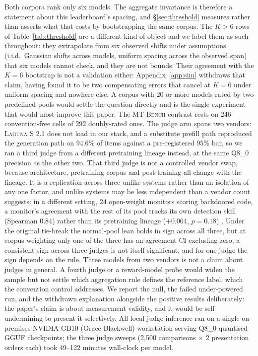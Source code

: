 \documentclass{article}
\begin{document}
Both corpora rank only six models. The aggregate invariance is therefore a statement
about this leaderboard's spacing, and \S\ref{sec:threshold} measures rather than asserts
what that costs by bootstrapping the same corpus. The $K > 6$ rows of
Table~\ref{tab:threshold} are a different kind of object and we label them as such
throughout: they extrapolate from six observed shifts under assumptions (i.i.d.\
Gaussian shifts across models, uniform spacing across the observed span) that six models
cannot check, and they are not bounds. Their agreement with the $K=6$ bootstrap is not a
validation either: Appendix~\ref{app:sim} withdraws that claim, having found it to be two
compensating errors that cancel at $K=6$ under uniform spacing and nowhere else. A corpus with $20$ or more models rated by two predefined
pools would settle the question directly and is the single experiment that would most
improve this paper. The \textsc{MT-Bench} contrast rests on $246$ convention-free cells of $292$
doubly-rated ones. The judge arm spans two vendors: \textsc{Laguna S 2.1} does not load in our stack, and a
substitute prefill path reproduced the generation path on $94.6\%$ of items against a
pre-registered $95\%$ bar, so we ran a third judge from a different pretraining lineage
instead, at the same Q8\_0 precision as the other two. That third judge is not a controlled
vendor swap, because architecture, pretraining corpus and post-training all change with
the lineage. It is a replication across three unlike systems rather than an isolation of
any one factor, and unlike systems may be less independent than a vendor count suggests:
in a different setting, $24$ open-weight monitors scoring backdoored code, a monitor's
agreement with the rest of its pool tracks its own detection skill (Spearman $0.84$)
rather than its pretraining lineage ($+0.064$, $p = 0.18$) \citep{jha2026decorrelation}. Under the original tie-break the normal-pool lean holds in
sign across all three, but at corpus weighting only one of the three has an agreement CI
excluding zero, a consistent sign across three judges is not itself significant, and for one
judge the sign depends on the rule. Three models from two vendors is not a claim about
judges in general. A fourth judge or a reward-model probe would widen the sample but not
settle which aggregation rule defines the reference label, which the convention control
addresses. We report the null, the failed under-powered run, and the withdrawn
explanation alongside the positive results deliberately: the paper's claim is
about measurement validity, and it would be self-undermining to present it
selectively. All local judge inference ran on a single on-premises NVIDIA GB10
(Grace Blackwell) workstation serving Q8\_0-quantised GGUF checkpoints; the three
judge sweeps (2{,}500 comparisons $\times$ 2 presentation orders each) took
49--122 minutes wall-clock per model.
\end{document}
